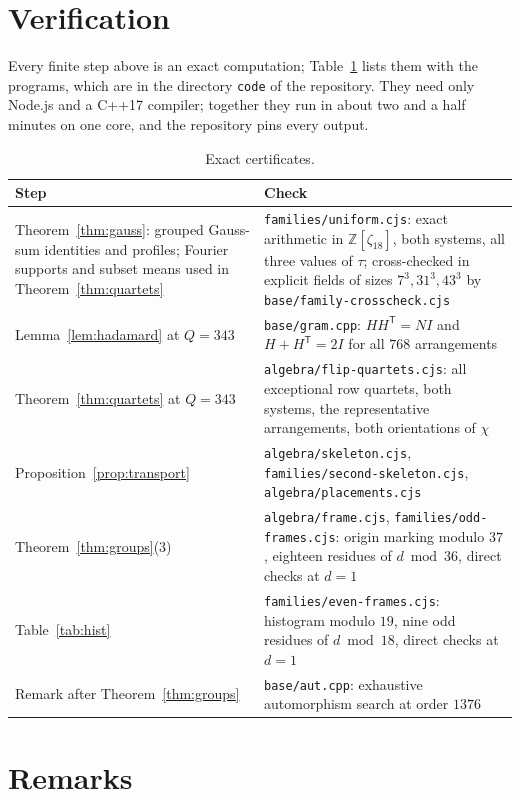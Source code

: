 \documentclass[11pt]{article}
\theoremstyle{plain}
\theoremstyle{definition}
\theoremstyle{remark}
\newcommand{\Z}{\mathbb Z}
\begin{document}
\section{Verification}\label{sec:verify}

Every finite step above is an exact computation; Table~\ref{tab:certs}
lists them with the programs, which are in the directory \texttt{code} of the
repository. They need only Node.js and a C++17 compiler; together they run in
about two and a half minutes on one core, and the repository pins every
output.

\begin{table}[ht]
\centering\small
\begin{tabular}{p{}p{}}
\toprule
Step & Check\\
\midrule
Theorem~\ref{thm:gauss}: grouped Gauss-sum identities and profiles; Fourier
supports and subset means used in Theorem~\ref{thm:quartets} &
\texttt{families/uniform.cjs}: exact arithmetic in $\Z[\zeta_{18}]$, both
systems, all three values of $\tau$; cross-checked in explicit fields of sizes
$7^3,31^3,43^3$ by \texttt{base/family-crosscheck.cjs}\\
Lemma~\ref{lem:hadamard} at $Q=343$ & \texttt{base/gram.cpp}:
$HH^{\mathsf T}=NI$ and $H+H^{\mathsf T}=2I$ for all $768$ arrangements\\
Theorem~\ref{thm:quartets} at $Q=343$ & \texttt{algebra/flip-quartets.cjs}:
all exceptional row quartets, both systems, the representative arrangements,
both orientations of $\chi$\\
Proposition~\ref{prop:transport} & \texttt{algebra/skeleton.cjs},
\texttt{families/second-skeleton.cjs}, \texttt{algebra/placements.cjs}\\
Theorem~\ref{thm:groups}(3) & \texttt{algebra/frame.cjs},
\texttt{families/odd-frames.cjs}: origin marking modulo $37$, eighteen
residues of $d\bmod36$, direct checks at $d=1$\\
Table~\ref{tab:hist} & \texttt{families/even-frames.cjs}: histogram modulo
$19$, nine odd residues of $d\bmod18$, direct checks at $d=1$\\
Remark after Theorem~\ref{thm:groups} & \texttt{base/aut.cpp}: exhaustive
automorphism search at order $1376$\\
\bottomrule
\end{tabular}
\caption{Exact certificates.}\label{tab:certs}
\end{table}

\section{Remarks}\label{sec:remarks}
\end{document}
